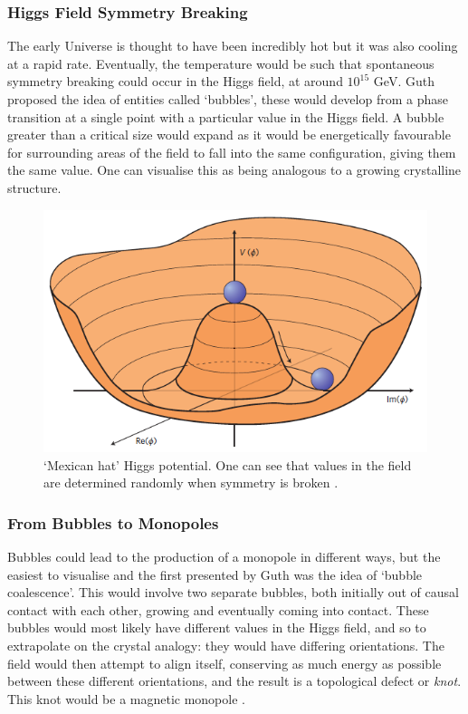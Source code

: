 \documentclass[twocolumn, 10pt]{article}
\begin{document}
\subsubsection{Higgs Field Symmetry Breaking}
The early Universe is thought to have been incredibly hot but it was also cooling at a rapid rate. Eventually, the temperature would be such that spontaneous symmetry breaking could occur in the Higgs field, at around $10^{15}$ GeV. Guth proposed the idea of entities called `bubbles', these would develop from a phase transition at a single point with a particular value in the Higgs field. A bubble greater than a critical size would expand as it would be energetically favourable for surrounding areas of the field to fall into the same configuration, giving them the same value. One can visualise this as being analogous to a growing crystalline structure.

\begin{figure}[h]
\includegraphics[width=\linewidth]{higgspotential.png}
\caption{`Mexican hat' Higgs potential. One can see that values in the field are determined randomly when symmetry is broken \cite{Ellis_2016}.}
\end{figure}
\subsubsection{From Bubbles to Monopoles}
Bubbles could lead to the production of a monopole in different ways, but the easiest to visualise and the first presented by Guth was the idea of `bubble coalescence'. This would involve two separate bubbles, both initially out of causal contact with each other, growing and eventually coming into contact. These bubbles would most likely have different values in the Higgs field, and so to extrapolate on the crystal analogy: they would have differing orientations. The field would then attempt to align itself, conserving as much energy as possible between these different orientations, and the result is a topological defect or \textit{knot}. This knot would be a magnetic monopole \cite{guth1980early}.
\end{document}

